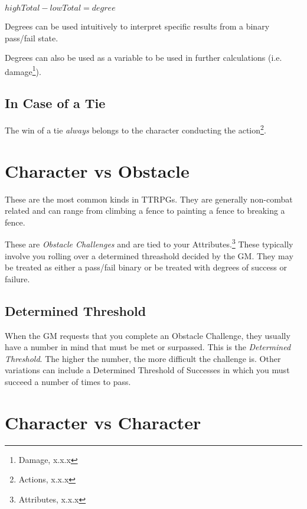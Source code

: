 $highTotal-lowTotal=degree$

Degrees can be used intuitively to interpret specific results from
a binary pass/fail state.

Degrees can also be used as a variable to be used in further calculations
(i.e. damage\footnote{Damage, x.x.x}).

\subsection{In Case of a Tie}

The win of a tie \emph{always} belongs to the character conducting
the action\footnote{Actions, x.x.x}.

\section{Character vs Obstacle}

These are the most common kinds in TTRPGs. They are generally non-combat
related and can range from climbing a fence to painting a fence to
breaking a fence. 

These are \emph{Obstacle Challenges} and are tied to your Attributes.\footnote{Attributes, x.x.x}
These typically involve you rolling over a determined threashold decided
by the GM. They may be treated as either a pass/fail binary or be
treated with degrees of success or failure.

\subsection{Determined Threshold}

When the GM requests that you complete an Obstacle Challenge, they
usually have a number in mind that must be met or surpassed. This
is the \emph{Determined Threshold}. The higher the number, the more
difficult the challenge is. Other variations can include a Determined
Threshold of Successes in
which you must succeed a number of times to pass.


\section{Character vs Character}

